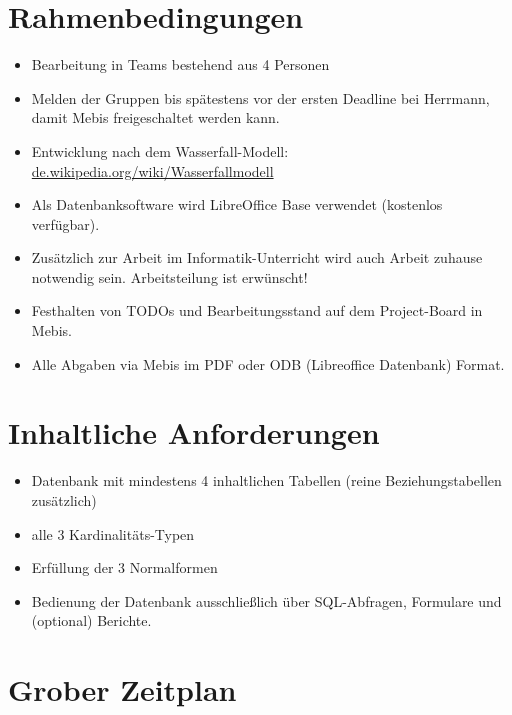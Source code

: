 

\section{Rahmenbedingungen}
\begin{itemize}
    \item Bearbeitung in Teams bestehend aus 4 Personen
    \item Melden der Gruppen bis spätestens vor der ersten Deadline bei Herrmann, damit Mebis freigeschaltet werden kann.
    \item Entwicklung nach dem Wasserfall-Modell: \url{de.wikipedia.org/wiki/Wasserfallmodell}
    \item Als Datenbanksoftware wird LibreOffice Base verwendet (kostenlos verfügbar).
    \item Zusätzlich zur Arbeit im Informatik-Unterricht wird auch Arbeit zuhause notwendig sein. Arbeitsteilung ist erwünscht!
    \item Festhalten von TODOs und Bearbeitungsstand auf dem Project-Board in Mebis.
    \item Alle Abgaben via Mebis im PDF oder ODB (Libreoffice Datenbank) Format.
\end{itemize}

\section{Inhaltliche Anforderungen}
\begin{itemize}
    \item Datenbank mit mindestens 4 inhaltlichen Tabellen (reine Beziehungstabellen zusätzlich)
    \item alle 3 Kardinalitäts-Typen
    \item Erfüllung der 3 Normalformen
    \item Bedienung der Datenbank ausschließlich über SQL-Abfragen, Formulare und (optional) Berichte.
\end{itemize}

\section{Grober Zeitplan}

